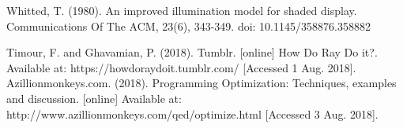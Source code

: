 \documentclass[letterpaper, 10 pt, conference]{ieeeconf}  %
\begin{document}





\begin{thebibliography}{99}

 Whitted, T. (1980). An improved illumination model for shaded display. Communications Of The ACM, 23(6), 343-349. doi: 10.1145/358876.358882

 Timour, F. and Ghavamian, P. (2018). Tumblr. [online] How Do Ray Do it?. Available at: https://howdoraydoit.tumblr.com/ [Accessed 1 Aug. 2018].
Azillionmonkeys.com. (2018). Programming Optimization: Techniques, examples and discussion. [online] Available at: http://www.azillionmonkeys.com/qed/optimize.html [Accessed 3 Aug. 2018].




\end{thebibliography}
\end{document}
